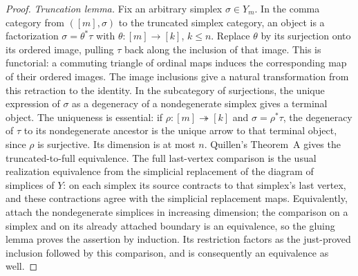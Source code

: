 \begin{proof}
\emph{Truncation lemma.}  Fix an arbitrary simplex $\sigma\in Y_m$.
In the comma category from $([m],\sigma)$ to the truncated simplex
category, an object is a factorization $\sigma=\theta^*\tau$ with
$\theta:[m]\to[k]$, $k\le n$.  Replace $\theta$ by its surjection
onto its ordered image, pulling $\tau$ back along the inclusion of that
image.  This is functorial: a commuting triangle of ordinal maps induces
the corresponding map of their ordered images.  The image inclusions
give a natural transformation from this retraction to the identity.
In the subcategory of surjections, the unique expression of $\sigma$
as a degeneracy of a nondegenerate simplex gives a terminal object.
The uniqueness is essential: if $\rho:[m]\twoheadrightarrow[k]$
and $\sigma=\rho^*\tau$, the degeneracy of $\tau$ to its
nondegenerate ancestor is the unique arrow to that terminal object,
since $\rho$ is surjective.  Its dimension is at most $n$.
Quillen's Theorem~A gives the truncated-to-full equivalence.
The full last-vertex comparison is the usual realization equivalence
from the simplicial replacement of the diagram of simplices of $Y$:
on each simplex its source contracts to that simplex's last vertex,
and these contractions agree with the simplicial replacement maps.
Equivalently, attach the nondegenerate simplices in increasing dimension;
the comparison on a simplex and on its already attached boundary is an
equivalence, so the gluing lemma proves the assertion by induction.
Its restriction factors as the just-proved inclusion followed by this
comparison, and is consequently an equivalence as well.
\end{proof}

